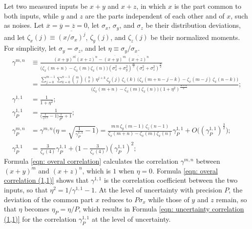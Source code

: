 \documentclass[twoside]{article}
\numberwithin{equation}{section}
\begin{document}
Let two measured inputs be $x + y$ and $x + z$, in which $x$ is the part common to both inputs, while $y$ and $z$ are the parts independent of each other and of $x$, such as noises.
Let $\overline{x} = \overline{y} = \overline{z} = 0$, let $\sigma_x$, $\sigma_y$, and $\sigma_z$ be their distribution deviations, and let $\zeta_x(j) \equiv \overline{(x / \sigma_x)^j}$, $\zeta_y(j)$, and $\zeta_z(j)$ be their normalized moments.
For simplicity, let $\sigma_y = \sigma_z$, and let $\eta \equiv \sigma_y / \sigma_x$.
\begin{align}
\label{eqn: overal correlation}
\gamma^{m,n} &\equiv \frac{\overline{(x + y)^m (x + z)^n} - \overline{(x + y)^m}\;\overline{(x + z)^n}}
		{\big(\zeta_x(m+n) - \zeta_x(m) \zeta_x(n)\big) (\sigma_x^2 + \sigma_y^2)^{\frac{m}{2}} (\sigma_x^2 + \sigma_z^2)^{\frac{n}{2}}} \nonumber \\
	&= \frac{\sum_{j=0}^{m-1} \sum_{k=0}^{n-1} \binom{m}{j} \binom{n}{k}\, \eta^{j+k}\, \zeta_y(j)\, \zeta_z(k)\, \big(\zeta_x(m+n-j-k) - \zeta_x(m-j)\, \zeta_x(n-k)\big)}
		{\big(\zeta_x(m+n) - \zeta_x(m) \zeta_x(n)\big) (1 + \eta^2)^{\frac{m+n}{2}}}; \\
\label{eqn: overal correlation (1,1)}
\gamma^{1,1} &= \frac{1}{1 + \eta^2}; \\
\label{eqn: uncertainty correlation (1,1)}
\gamma_P^{1,1} &= \frac{1}{\Big(\frac{1}{\gamma^{1,1}} - 1\Big) \frac{1}{P^2} + 1}; \\
\label{eqn: uncertainty correlation}
\gamma_P^{m,n} &= \gamma^{m,n}\Big(\eta = \sqrt{\frac{1}{\gamma_P^{1,1}} - 1}\Big)
	= \frac{m\, n\, \zeta_y(m-1)\, \zeta_z(n-1)}{\zeta_x(m+n) - \zeta_x(m) \zeta_x(n)} \gamma_P^{1,1} + O\big((\gamma_P^{1,1})^\frac{3}{2}\big); \\
\label{eqn: uncertainty correlation (3,1)}
\gamma_P^{3,1} &= \frac{3}{\zeta_x(4)} \gamma_P^{1,1} + \Big(1 - \frac{3}{\zeta_x(4)}\Big) (\gamma_P^{1,1})^2;
\end{align}
Formula \eqref{eqn: overal correlation} calculates the correlation $\gamma^{m,n}$ between $(x + y)^m$ and $(x + z)^n$, which is $1$ when $\eta = 0$.
Formula \eqref{eqn: overal correlation (1,1)} shows that $\gamma^{1,1}$ is the correlation coefficient between the two inputs, so that $\eta^2 = 1/\gamma^{1,1} - 1$.
At the level of uncertainty with precision $P$, the deviation of the common part $x$ reduces to $P \sigma_x$ while those of $y$ and $z$ remain, so that $\eta$ becomes $\eta_P = \eta / P$, which results in Formula \eqref{eqn: uncertainty correlation (1,1)} for the correlation $\gamma_P^{1,1}$ at the level of uncertainty.
\end{document}
